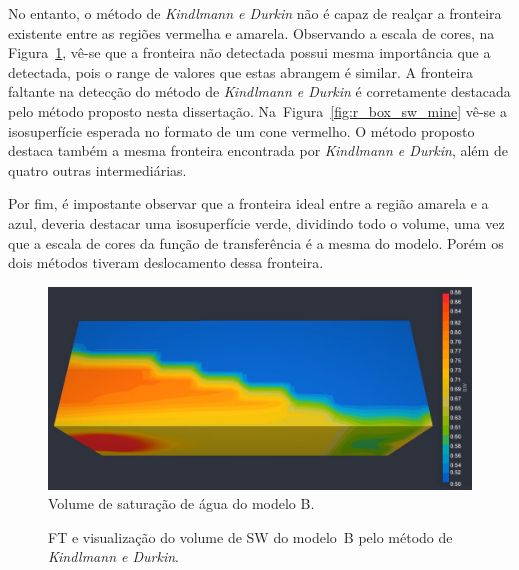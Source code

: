	No entanto, o método de \textit{Kindlmann e Durkin} não é capaz de realçar a fronteira existente entre as regiões vermelha e amarela. Observando a escala de cores, na Figura~\ref{fig:r_box_sw_slice}, vê-se que a fronteira não detectada possui mesma importância que a detectada, pois o range de valores que estas abrangem é similar. A fronteira faltante na detecção do método de \textit{Kindlmann e Durkin} é corretamente destacada pelo método proposto nesta dissertação. Na~Figura~\ref{fig:r_box_sw_mine} vê-se a isosuperfície esperada no formato de um cone vermelho. O método proposto destaca também a mesma fronteira encontrada por \textit{Kindlmann e Durkin}, além de quatro outras intermediárias.
	
	Por fim, é impostante observar que a fronteira ideal entre a região amarela e a azul, deveria destacar uma isosuperfície verde, dividindo todo o volume, uma vez que a escala de cores da função de transferência é a mesma do modelo. Porém os dois métodos tiveram deslocamento dessa fronteira.
	
\begin{figure}[h]
	\centering
	\includegraphics[width=1\textwidth]{images/r_box_sw_slice}
	\caption{Volume de saturação de água do modelo B.}
	\label{fig:r_box_sw_slice}
\end{figure}

\begin{figure}[h]
	\centering
	\caption{FT e visualização do volume de SW do modelo~B pelo método de \textit{Kindlmann e Durkin}.}
	\label{fig:r_box_sw_kd}
\end{figure}

